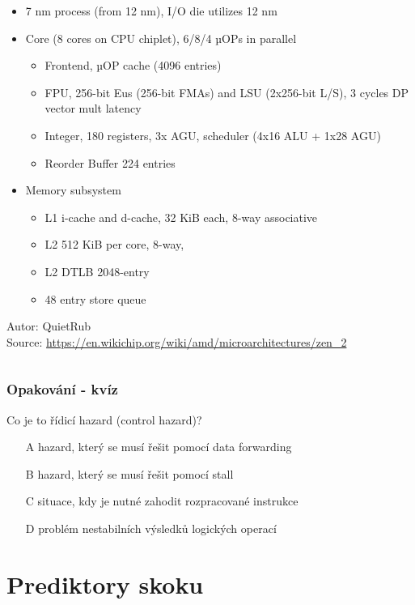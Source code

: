 \documentclass{beamer}
\begin{document}
\begin{frame}
\begin{columns}[T]
\begin{column}{0.66\textwidth}
\scriptsize
\begin{itemize}
\item 7 nm process (from 12 nm), I/O die utilizes 12 nm
\item Core (8 cores on CPU chiplet),  6/8/4 µOPs in parallel
\begin{itemize}
\scriptsize
\item Frontend, µOP cache (4096 entries)
\item FPU, 256-bit Eus (256-bit FMAs) and LSU (2x256-bit L/S), 3 cycles DP vector mult latency
\item Integer, 180 registers, 3x AGU, scheduler (4x16 ALU + 1x28 AGU)
\item Reorder Buffer 224 entries
\end{itemize}
\item Memory subsystem
\begin{itemize}
\scriptsize
\item L1 i-cache and d-cache, 32 KiB each,  8-way associative
\item L2 512 KiB per core, 8-way, 
\item L2 DTLB 2048-entry
\item 48 entry store queue
\end{itemize}
\end{itemize}
Autor: QuietRub\\
Source: \url{https://en.wikichip.org/wiki/amd/microarchitectures/zen_2}
\end{column}
\end{columns}

\end{frame}


\begin{frame}
\frametitle{Opakování - kvíz}

Co je to řídicí hazard (control hazard)?

\bigskip
\begin{itemize}
 \item[A] hazard, který se musí řešit pomocí data forwarding
 \item[B] hazard, který se musí řešit pomocí stall
 \item[C] situace, kdy je nutné zahodit rozpracované instrukce
 \item[D] problém nestabilních výsledků logických operací
\end{itemize}
\end{frame}

\section{Prediktory skoku}
\end{document}
